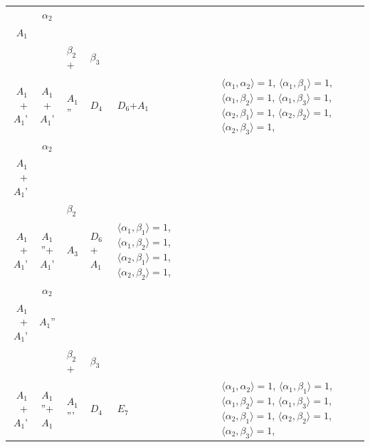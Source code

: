 \documentclass[12pt]{report}
\begin{document}
\begin{appendix}
{\begin{longtable}{rcl p{1cm}p{1cm}p{3cm} }
\\
\begin{tabular}{cc}$\alpha_1$+ & $\alpha_2$\\\tiny{ $A_1$ } & \tiny{  }\end{tabular} &\begin{tabular}{c} = \\~ \end{tabular} & \begin{tabular}{ccc}$\beta_1$+ & $\beta_2$+ & $\beta_3$\\\tiny{ $A_1$+$A_1$' } & \tiny{ $A_1$+$A_1$' } & \tiny{ $A_1$'' }\end{tabular} & $D_4$ & $D_6$+$A_1$ & $\langle\alpha_1, \alpha_2\rangle=1$,  $\langle\alpha_1, \beta_1\rangle=1$, $\langle\alpha_1, \beta_2\rangle=1$, $\langle\alpha_1, \beta_3\rangle=1$, $\langle\alpha_2, \beta_1\rangle=1$, $\langle\alpha_2, \beta_2\rangle=1$, $\langle\alpha_2, \beta_3\rangle=1$, 
\\
\begin{tabular}{cc}$\alpha_1$+ & $\alpha_2$\\\tiny{ $A_1$+$A_1$' } & \tiny{  }\end{tabular} &\begin{tabular}{c} = \\~ \end{tabular} & \begin{tabular}{cc}$\beta_1$+ & $\beta_2$\\\tiny{ $A_1$+$A_1$' } & \tiny{ $A_1$''+$A_1$' }\end{tabular} & $A_3$ & $D_6$+$A_1$ &  $\langle\alpha_1, \beta_1\rangle=1$, $\langle\alpha_1, \beta_2\rangle=1$, $\langle\alpha_2, \beta_1\rangle=1$, $\langle\alpha_2, \beta_2\rangle=1$, 
\\
\begin{tabular}{cc}$\alpha_1$+ & $\alpha_2$\\\tiny{ $A_1$+$A_1$' } & \tiny{ $A_1$'' }\end{tabular} &\begin{tabular}{c} = \\~ \end{tabular} & \begin{tabular}{ccc}$\beta_1$+ & $\beta_2$+ & $\beta_3$\\\tiny{ $A_1$+$A_1$' } & \tiny{ $A_1$''+$A_1$ } & \tiny{ $A_1$''' }\end{tabular} & $D_4$ & $E_7$ & $\langle\alpha_1, \alpha_2\rangle=1$,  $\langle\alpha_1, \beta_1\rangle=1$, $\langle\alpha_1, \beta_2\rangle=1$, $\langle\alpha_1, \beta_3\rangle=1$, $\langle\alpha_2, \beta_1\rangle=1$, $\langle\alpha_2, \beta_2\rangle=1$, $\langle\alpha_2, \beta_3\rangle=1$, 

\end{longtable}}
\end{appendix}
\end{document}
